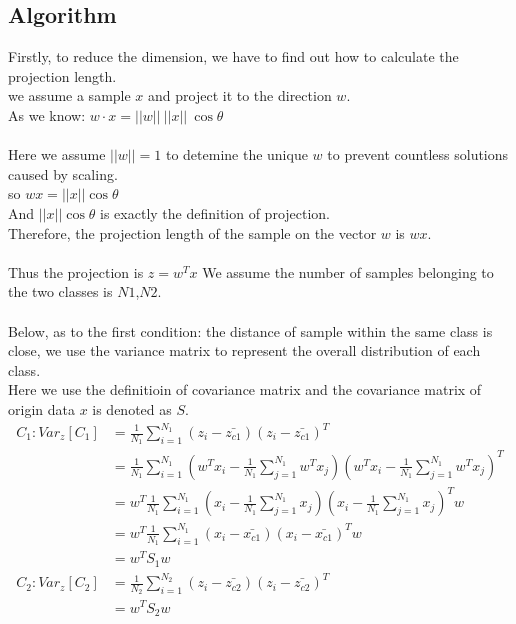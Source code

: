 \documentclass{report}
\begin{document}
\subsection{Algorithm}
Firstly, to reduce the dimension, we have to find out how to calculate the projection length.\\
we assume a sample $x$ and project it to the direction $w$.\\
As we know: $w\cdot x=||w||\ ||x||\ \cos{\theta}$\\\\
Here we assume $||w||=1$ to detemine the unique $w$ to prevent countless solutions caused by scaling.\\
so $w x=||x||\cos{\theta}$\\
And $||x||\cos{\theta}$ is exactly the definition of projection.\\
Therefore, the projection length of the sample on the vector $w$ is $wx$.\\\\
Thus the projection is $z=w^T x$
We assume the number of samples belonging to the two classes is $N1$,$N2$.\\\\
Below, as to the first condition: the distance of sample within the same class is close, we use the variance matrix to represent the overall distribution of each class.\\
Here we use the definitioin of covariance matrix and the covariance matrix of origin data $x$ is denoted as $S$.\\
\begin{equation}
\begin{aligned}C_1: Var_z[C_1]&=\frac{1}{N_1}\sum_{i=1}^{N_1} (z_i-\bar{z_{c1}})(z_i-\bar{z_{c1}})^T\\
&=\frac{1}{N_1}\sum_{i=1}^{N_1}(w^T x_i-\frac{1}{N_1}\sum_{j=1}^{N_1}w^T x_j)(w^T x_i-\frac{1}{N_1}\sum_{j=1}^{N_1}w^T x_j)^T \\&=w^T \frac{1}{N_1}\sum_{i=1}^{N_1}(x_i-\frac{1}{N_1}\sum_{j=1}^{N_1} x_j)(x_i-\frac{1}{N_1}\sum_{j=1}^{N_1} x_j)^T w\\&=w^{T} \frac{1}{N_{1}} \sum_{i=1}^{N_{1}}\left(x_{i}-\bar{x_{c 1}}\right)\left(x_{i}-\bar{x_{c 1}}\right)^{T} w\\&=w^T S_1 w\\C_2: Var_z[C_2]&=\frac{1}{N_2}\sum_{i=1}^{N_2} (z_i-\bar{z_{c2}})(z_i-\bar{z_{c2}})^T\\&=w^T S_2 w
\end{aligned}
\end{equation}
\end{document}
